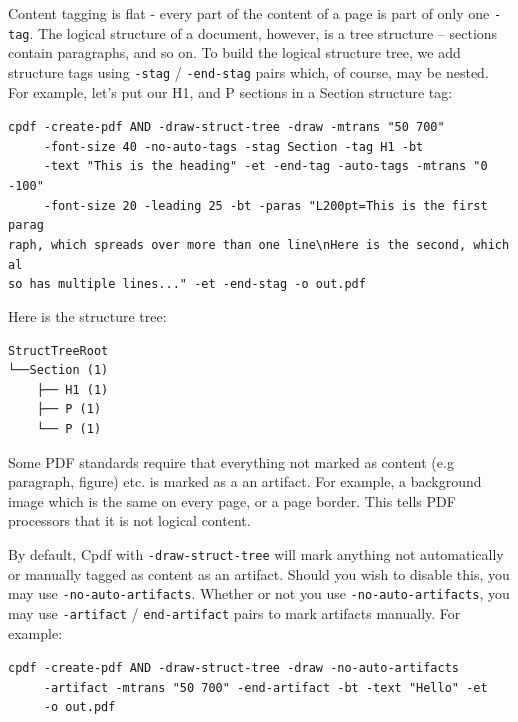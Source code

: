 \documentclass{book}
\begin{document}
\noindent Content tagging is flat - every part of the content of a page is part of only one \texttt{-tag}. The logical structure of a document, however, is a tree structure -- sections contain paragraphs, and so on. To build the logical structure tree, we add structure tags using \texttt{-stag} / \texttt{-end-stag} pairs which, of course, may be nested. For example, let's put our H1, and P sections in a Section structure tag:

\begin{framed}
   \noindent\small\verb!cpdf -create-pdf AND -draw-struct-tree -draw -mtrans "50 700" !\\
   \noindent\small\verb!     -font-size 40 -no-auto-tags -stag Section -tag H1 -bt!\\
   \noindent\small\verb!     -text "This is the heading" -et -end-tag -auto-tags -mtrans "0 -100" !\\
   \noindent\small\verb!     -font-size 20 -leading 25 -bt -paras "L200pt=This is the first parag!\\
   \noindent\small\verb!raph, which spreads over more than one line\nHere is the second, which al!\\
   \noindent\small\verb!so has multiple lines..." -et -end-stag -o out.pdf!
\end{framed}

\noindent Here is the structure tree:

\begin{verbatim}
StructTreeRoot
└──Section (1)
    ├── H1 (1)
    ├── P (1)
    └── P (1)
\end{verbatim}

\noindent Some PDF standards require that everything not marked as content (e.g paragraph, figure) etc. is marked as a an artifact. For example, a background image which is the same on every page, or a page border. This tells PDF processors that it is not logical content.

By default, Cpdf with \texttt{-draw-struct-tree} will mark anything not automatically or manually tagged as content as an artifact. Should you wish to disable this, you may use \texttt{-no-auto-artifacts}. Whether or not you use \texttt{-no-auto-artifacts}, you may use \texttt{-artifact} / \texttt{end-artifact} pairs to mark artifacts manually. For example:

\begin{framed}
   \noindent\small\verb!cpdf -create-pdf AND -draw-struct-tree -draw -no-auto-artifacts!\\
   \noindent\small\verb!     -artifact -mtrans "50 700" -end-artifact -bt -text "Hello" -et!\\
   \noindent\small\verb!     -o out.pdf!
\end{framed}
\end{document}
